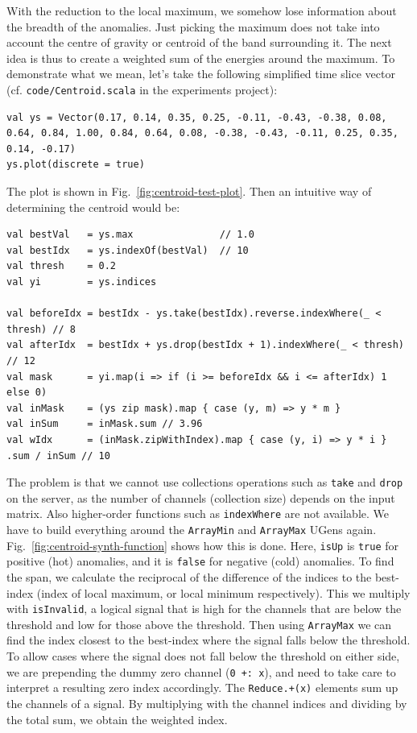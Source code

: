 \documentclass[11pt,a4paper]{article}
\newcommand{\figref}[1]{Fig.~\ref{#1}}
\begin{document}
With the reduction to the local maximum, we somehow lose information about the breadth of the anomalies. Just picking the maximum does not take into account the centre of gravity or centroid of the band surrounding it. The next idea is thus to create a weighted sum of the energies around the maximum. To demonstrate what we mean, let's take the following simplified time slice vector (cf. \Verb!code/Centroid.scala! in the experiments project):
%
\begin{lstlisting}[style=scala]
val ys = Vector(0.17, 0.14, 0.35, 0.25, -0.11, -0.43, -0.38, 0.08, 0.64, 0.84, 1.00, 0.84, 0.64, 0.08, -0.38, -0.43, -0.11, 0.25, 0.35, 0.14, -0.17)
ys.plot(discrete = true)
\end{lstlisting}
%
The plot is shown in \figref{fig:centroid-test-plot}. Then an intuitive way of determining the centroid would be:
%
\begin{lstlisting}[style=scala]
val bestVal   = ys.max               // 1.0
val bestIdx   = ys.indexOf(bestVal)  // 10
val thresh    = 0.2
val yi        = ys.indices

val beforeIdx = bestIdx - ys.take(bestIdx).reverse.indexWhere(_ < thresh) // 8
val afterIdx  = bestIdx + ys.drop(bestIdx + 1).indexWhere(_ < thresh) // 12
val mask      = yi.map(i => if (i >= beforeIdx && i <= afterIdx) 1 else 0)
val inMask    = (ys zip mask).map { case (y, m) => y * m }
val inSum     = inMask.sum // 3.96
val wIdx      = (inMask.zipWithIndex).map { case (y, i) => y * i } .sum / inSum // 10
\end{lstlisting}
%
The problem is that we cannot use collections operations such as \Verb!take! and \Verb!drop! on the server, as the number of channels (collection size) depends on the input matrix. Also higher-order functions such as \Verb!indexWhere! are not available. We have to build everything around the \Verb!ArrayMin! and \Verb!ArrayMax! UGens again. \figref{fig:centroid-synth-function} shows how this is done. Here, \Verb!isUp! is \Verb!true! for positive (hot) anomalies, and it is \Verb!false! for negative (cold) anomalies. To find the span, we calculate the reciprocal of the difference of the indices to the best-index (index of local maximum, or local minimum respectively). This we multiply with \Verb!isInvalid!, a logical signal that is high for the channels that are below the threshold and low for those above the threshold. Then using \Verb!ArrayMax! we can find the index closest to the best-index where the signal falls below the threshold. To allow cases where the signal does not fall below the threshold on either side, we are prepending the dummy zero channel (\Verb!0 +: x!), and need to take care to interpret a resulting zero index accordingly. The \Verb!Reduce.+(x)! elements sum up the channels of a signal. By multiplying with the channel indices and dividing by the total sum, we obtain the weighted index.
\end{document}
